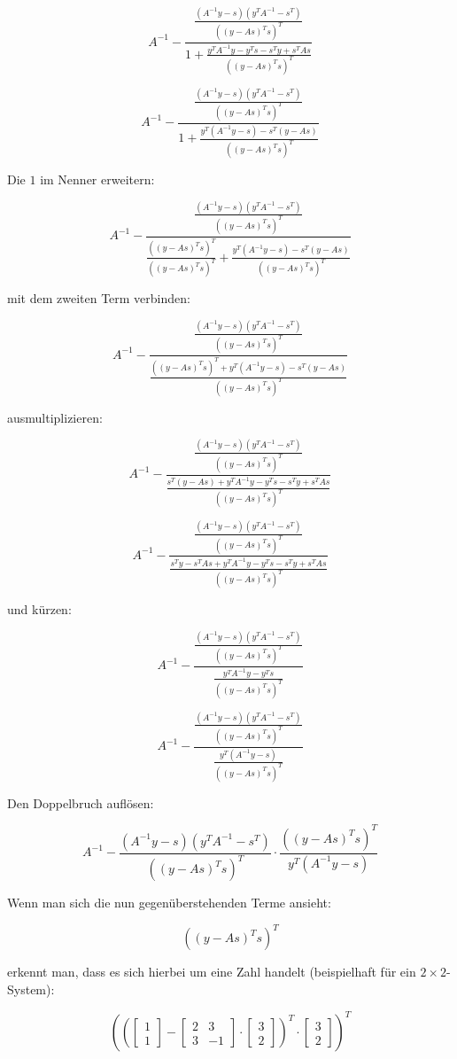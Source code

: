 \documentclass[a4paper, 12pt]{report}
\begin{document}
$$ A^{-1} - \frac{ \frac{ (A^{-1}y-s)(y^TA^{-1}-s^T) }{\left( (y-As)^Ts\right)^T } }{1 + \frac{ y^TA^{-1}y - y^Ts - s^Ty + s^TAs }{\left( (y-As)^Ts\right)^T}}$$

$$ A^{-1} - \frac{ \frac{ (A^{-1}y-s)(y^TA^{-1}-s^T) }{\left( (y-As)^Ts\right)^T } }{1 + \frac{ y^T(A^{-1}y - s) - s^T(y - As) }{\left( (y-As)^Ts\right)^T}}$$

Die $1$ im Nenner erweitern:

$$ A^{-1} - \frac{ \frac{ (A^{-1}y-s)(y^TA^{-1}-s^T) }{\left( (y-As)^Ts\right)^T } }{ \frac{\left( (y-As)^Ts\right)^T}{\left( (y-As)^Ts\right)^T} + \frac{ y^T(A^{-1}y - s) - s^T(y - As) }{\left( (y-As)^Ts\right)^T}}$$

mit dem zweiten Term verbinden:

$$ A^{-1} - \frac{ \frac{ (A^{-1}y-s)(y^TA^{-1}-s^T) }{\left( (y-As)^Ts\right)^T } }{ \frac{ \left( (y-As)^Ts\right)^T + y^T(A^{-1}y - s) - s^T(y - As) }{\left( (y-As)^Ts\right)^T}}$$

ausmultiplizieren:

$$ A^{-1} - \frac{ \frac{ (A^{-1}y-s)(y^TA^{-1}-s^T) }{\left( (y-As)^Ts\right)^T } }{ \frac{ s^T(y - As) + y^TA^{-1}y - y^Ts - s^Ty + s^TAs }{\left( (y-As)^Ts\right)^T}}$$

$$ A^{-1} - \frac{ \frac{ (A^{-1}y-s)(y^TA^{-1}-s^T) }{\left( (y-As)^Ts\right)^T } }{ \frac{ s^Ty - s^TAs + y^TA^{-1}y - y^Ts - s^Ty + s^TAs }{\left( (y-As)^Ts\right)^T}}$$

und kürzen:

$$ A^{-1} - \frac{ \frac{ (A^{-1}y-s)(y^TA^{-1}-s^T) }{\left( (y-As)^Ts\right)^T } }{ \frac{ y^TA^{-1}y - y^Ts }{\left( (y-As)^Ts\right)^T}}$$

$$ A^{-1} - \frac{ \frac{ (A^{-1}y-s)(y^TA^{-1}-s^T) }{\left( (y-As)^Ts\right)^T } }{ \frac{ y^T(A^{-1}y - s) }{\left( (y-As)^Ts\right)^T}}$$

Den Doppelbruch auflösen:

$$ A^{-1} - \frac{ (A^{-1}y-s)(y^TA^{-1}-s^T) }{\left( (y-As)^Ts\right)^T } \cdot \frac{ \left( (y-As)^Ts\right)^T }{ y^T(A^{-1}y - s) }$$

Wenn man sich die nun gegenüberstehenden Terme ansieht:

$$\left( (y-As)^Ts\right)^T$$

erkennt man, dass es sich hierbei um eine Zahl handelt (beispielhaft für ein $2\times 2$-System):

$$\left( \left(\begin{bmatrix}1\\1\end{bmatrix} - \begin{bmatrix}2 & 3\\3 & -1\end{bmatrix}\cdot \begin{bmatrix}3\\2\end{bmatrix} \right)^T\cdot \begin{bmatrix}3\\2\end{bmatrix} \right)^T$$
\end{document}
